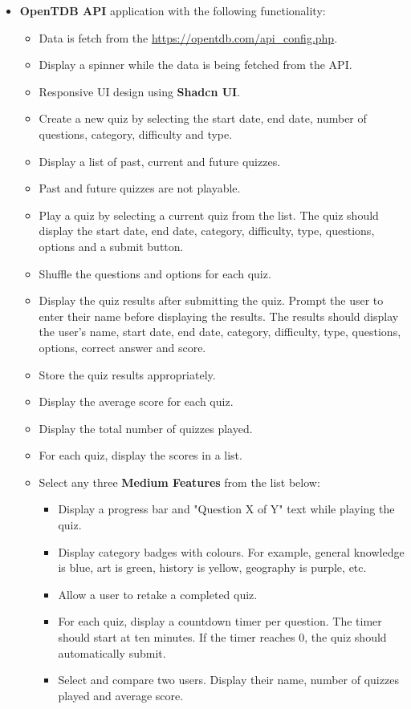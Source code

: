 \documentclass{article}
\begin{document}
\begin{itemize}
		 \item \textbf{OpenTDB API} application with the following functionality:
		 \begin{itemize}
			\item Data is fetch from the \href{OpenTDB API}{https://opentdb.com/api\_config.php}.
			\item Display a spinner while the data is being fetched from the API.
			\item Responsive UI design using \textbf{Shadcn UI}.
			\item Create a new quiz by selecting the start date, end date, number of questions, category, difficulty and type.
			\item Display a list of past, current and future quizzes.
			\item Past and future quizzes are not playable.
			\item Play a quiz by selecting a current quiz from the list. The quiz should display the start date, end date, category, difficulty, type, questions, options and a submit button.
			\item Shuffle the questions and options for each quiz.
			\item Display the quiz results after submitting the quiz. Prompt the user to enter their name before displaying the results. The results should display the user's name, start date, end date, category, difficulty, type, questions, options, correct answer and score.
			\item Store the quiz results appropriately.
			\item Display the average score for each quiz.
			\item Display the total number of quizzes played.
			\item For each quiz, display the scores in a list.
			\item Select any three \textbf{Medium Features} from the list below:
			\begin{itemize}
				\item Display a progress bar and "Question X of Y" text while playing the quiz.
				\item Display category badges with colours. For example, general knowledge is blue, art is green, history is yellow, geography is purple, etc.
				\item Allow a user to retake a completed quiz.
				\item For each quiz, display a countdown timer per question. The timer should start at ten minutes. If the timer reaches 0, the quiz should automatically submit.
				\item Select and compare two users. Display their name, number of quizzes played and average score.
			 \end{itemize}	
		 \end{itemize}
	\end{itemize}
	
\end{document}
